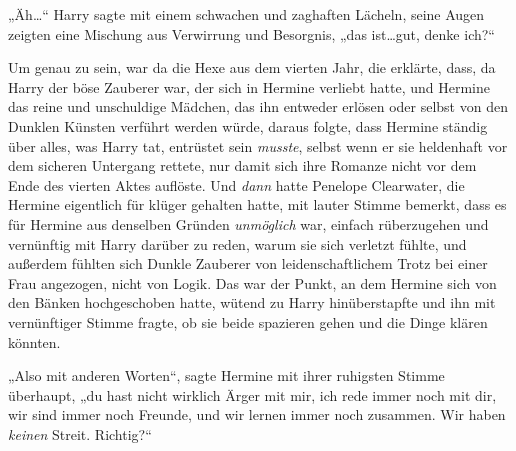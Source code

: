 „Äh…“ Harry sagte mit einem schwachen und zaghaften Lächeln, seine Augen zeigten eine Mischung aus Verwirrung und Besorgnis, „das ist…gut, denke ich?“

Um genau zu sein, war da die Hexe aus dem vierten Jahr, die erklärte, dass, da Harry der böse Zauberer war, der sich in Hermine verliebt hatte, und Hermine das reine und unschuldige Mädchen, das ihn entweder erlösen oder selbst von den Dunklen Künsten verführt werden würde, daraus folgte, dass Hermine ständig über alles, was Harry tat, entrüstet sein \emph{musste}, selbst wenn er sie heldenhaft vor dem sicheren Untergang rettete, nur damit sich ihre Romanze nicht vor dem Ende des vierten Aktes auflöste. Und \emph{dann} hatte Penelope Clearwater, die Hermine eigentlich für klüger gehalten hatte, mit lauter Stimme bemerkt, dass es für Hermine aus denselben Gründen \emph{unmöglich} war, einfach rüberzugehen und vernünftig mit Harry darüber zu reden, warum sie sich verletzt fühlte, und außerdem fühlten sich Dunkle Zauberer von leidenschaftlichem Trotz bei einer Frau angezogen, nicht von Logik. Das war der Punkt, an dem Hermine sich von den Bänken hochgeschoben hatte, wütend zu Harry hinüberstapfte und ihn mit vernünftiger Stimme fragte, ob sie beide spazieren gehen und die Dinge klären könnten.

„Also mit anderen Worten“, sagte Hermine mit ihrer ruhigsten Stimme überhaupt, „du hast nicht wirklich Ärger mit mir, ich rede immer noch mit dir, wir sind immer noch Freunde, und wir lernen immer noch zusammen. Wir haben \emph{keinen} Streit. Richtig?“

